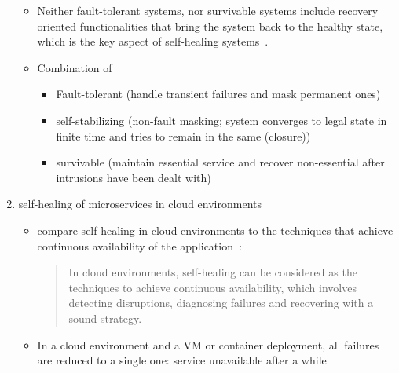 \begin{enumerate}
\begin{itemize}
    \item Neither fault-tolerant systems, nor survivable systems include recovery oriented functionalities that bring the system back to the healthy state, which is the key aspect of self-healing systems~\cite{Ghosh}.
    
    \item Combination of~\cite{PsaierSurvey}
    \begin{itemize}
      \item Fault-tolerant (handle transient failures and mask permanent ones)
      \item self-stabilizing (non-fault masking; system converges to legal state in finite time and tries to remain in the same (closure))
      \item survivable (maintain essential service and recover non-essential after intrusions have been dealt with)
    \end{itemize}
  \end{itemize}
  
  \item self-healing of microservices in cloud environments
  \begin{itemize}
    \item \citeauthor{PsaierSurvey} compare self-healing in cloud environments to the techniques that achieve continuous availability of the application~\cite{PsaierSurvey}:
    \begin{quote}
      In cloud environments, self-healing can be considered as the techniques to achieve continuous availability, which involves detecting disruptions, diagnosing failures and recovering with a sound strategy.
    \end{quote}
    \item In a cloud environment and a VM or container deployment, all failures are reduced to a single one: service unavailable after a while
  \end{itemize}
\end{enumerate}